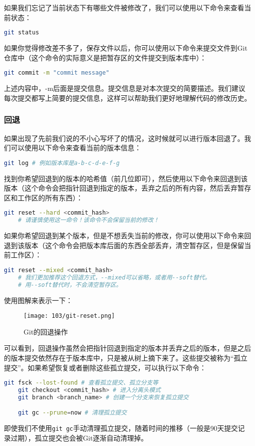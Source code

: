 如果我们忘记了当前状态下有哪些文件被修改了，我们可以使用以下命令来查看当前状态：
\begin{lstlisting}[language=bash]
    git status
\end{lstlisting}

如果你觉得修改差不多了，保存文件以后，你可以使用以下命令来提交文件到Git仓库中（这个命令的实际意义是把暂存区的文件提交到版本库中）：

\begin{lstlisting}[language=bash]
    git commit -m "commit message"
\end{lstlisting}

上述内容中，-m后面是提交信息。提交信息是对本次提交的简要描述。我们建议每次提交都写上简要的提交信息，这样可以帮助我们更好地理解代码的修改历史。

\subsubsection{回退}

如果出现了先前我们说的不小心写坏了的情况，这时候就可以进行版本回退了。我们可以使用以下命令来查看当前的版本信息：

\begin{lstlisting}[language=bash]
    git log # 例如版本库是a-b-c-d-e-f-g
\end{lstlisting}

找到你希望回退到的版本的哈希值（前几位即可），然后使用以下命令来回退到该版本（这个命令会把指针回退到指定的版本，丢弃之后的所有内容，然后丢弃暂存区和工作区的所有东西）：

\begin{lstlisting}[language=bash]
    git reset --hard <commit_hash>
    # 请谨慎使用这一命令！该命令不会保留当前的修改！
\end{lstlisting}

如果你希望回退到某个版本，但是不想丢失当前的修改，你可以使用以下命令来回退到该版本（这个命令会把版本库后面的东西全部丢弃，清空暂存区，但是保留当前工作区）：
\begin{lstlisting}[language=bash]
    git reset --mixed <commit_hash>
    # 我们更加推荐这个回退方式，--mixed可以省略，或者用--soft替代。
    # 用--soft替代时，不会清空暂存区。
\end{lstlisting}

使用图解来表示一下：
\begin{figure}[ht]
  \centering
  \texttt{[image: 103/git-reset.png]}
  \caption{Git的回退操作}
  \label{fig:git-reset}
\end{figure}
可以看到，回退操作虽然会把指针回退到指定的版本并丢弃之后的版本，但是之后的版本提交依然存在于版本库中，只是被从树上摘下来了。这些提交被称为“孤立提交”。如果希望恢复或者删除这些孤立提交，可以执行以下命令：
\begin{lstlisting}[language=bash]
    git fsck --lost-found # 查看孤立提交、孤立分支等
    git checkout <commit_hash> # 进入分离头模式
    git branch <branch_name> # 创建一个分支来恢复孤立提交

    git gc --prune=now # 清理孤立提交
\end{lstlisting}
即使我们不使用\texttt{git gc}手动清理孤立提交，随着时间的推移（一般是90天提交记录过期），孤立提交也会被Git逐渐自动清理掉。

